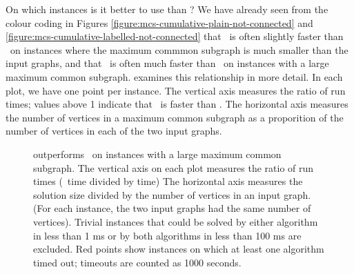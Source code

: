 On which instances is it better to use \McSplit{$\downarrow$} than \McSplit?
We have already seen from the colour coding in Figures
\ref{figure:mcs-cumulative-plain-not-connected} and
\ref{figure:mcs-cumulative-labelled-not-connected}
that \McSplit\ is often slightly faster than \McSplitDown\ on instances where
the maximum commmon subgraph is much smaller than the input graphs, and that
\McSplitDown\ is often much faster than \McSplit\ on instances with a large
maximum common subgraph.  
examines this relationship in more detail.  In each plot, we have one
point per instance.  The vertical axis measures the ratio of run times;
values above 1 indicate that \McSplitDown\ is faster than \McSplit.
The horizontal axis measures the number of vertices in a maximum
common subgraph as a proporition of the number of vertices in each
of the two input graphs.

\begin{figure}[htb]
    \centering
    \caption{\McSplit{$\downarrow$} outperforms \McSplit\ on instances with a large maximum common subgraph.
        The vertical axis on each plot measures the ratio of run times (\McSplit\ time divided by \McSplit{$\downarrow$} time)
        The horizontal axis measures the solution size divided by the number of vertices
        in an input graph.  (For each instance, the two input graphs had
        the same number of vertices).  Trivial instances that could be solved by either algorithm in less
        than 1 ms or by both algorithms in less than 100 ms are excluded.  Red points show instances
        on which at least one algorithm timed out; timeouts are counted as 1000
        seconds.}\label{figure:mcsplit-runtime-ratio-soln-size}
\end{figure}

